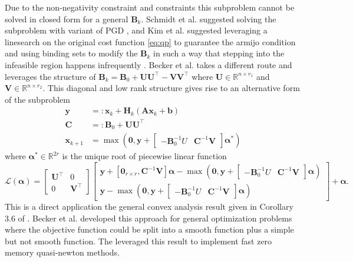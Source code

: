 \documentclass{article}
\newcommand{\x}{\mathbf{x}}
\renewcommand{\b}{\mathbf{b}}
\newcommand{\A}{\mathbf{A}}
\newcommand{\V}{\mathbf{V}}
\newcommand{\y}{\mathbf{y}}
\renewcommand{\H}{\mathbf{H}}
\newcommand{\B}{\mathbf{B}}
\newcommand{\U}{\mathbf{U}}
\begin{document}
Due to the non-negativity constraint and constraints this subproblem cannot be solved in closed form for a general $\B_k$. Schmidt et al. suggested solving the subproblem with variant of PGD \citep{SchmidtBergFriedlanderEtAl2009ProcTwelfthIntConfArtifIntellStat}, and Kim et al. suggested leveraging a linesearch on the original cost function \eqref{eq:qp} to guarantee the armijo condition and using binding sets to modify the $\B_k$ in such a way that stepping into the infeasible region happens infrequently \citep{KimSraDhillon2010SIAMJSciComput}. Becker et al. takes a different route and leverages the structure of $\B_k = \B_0 + \U\U^\top - \V\V^\top$ where $\U \in \mathbb{R}^{n\times r_1}$ and $\V \in \mathbb{R}^{n\times r_2}$. This diagonal and low rank structure gives rise to an alternative form of the subproblem  
\begin{equation} \label{eq:prox-step}
    \begin{split}
        \y &=: \x_k + \H_k (\A\x_k + \b)\\
        \mathbf{C} &=: \B_0 + \U\U^\top\\
         \x_{k+1} &= \operatorname{max}\left(\mathbf{0},\y + \begin{bmatrix} 
            - \B_0^{-1} U & \mathbf{C}^{-1} \V 
        \end{bmatrix} \boldsymbol{\alpha}^*\right) 
\end{split}
\end{equation}
where $\boldsymbol{\alpha}^* \in \mathbb{R}^{2r}$ is the unique root of piecewise linear function
\[
\mathcal{L}\left(\boldsymbol{\alpha}\right) = \begin{bmatrix} 
        \U^{\top}&0 \\ 0&\V^{\top} 
    \end{bmatrix} \begin{bmatrix} 
       \y+[\mathbf{0}_{r\times r}, \mathbf{C}^{-1} \V] \boldsymbol{\alpha}- \operatorname{max}\left(\mathbf{0},\y + \begin{bmatrix} 
            - \B_0^{-1} U & \mathbf{C}^{-1} \V 
        \end{bmatrix} \boldsymbol{\alpha}\right) \\
       \y -  \operatorname{max}\left(\mathbf{0},\y + \begin{bmatrix} 
            - \B_0^{-1} U & \mathbf{C}^{-1} \V 
        \end{bmatrix} \boldsymbol{\alpha}\right)  
    \end{bmatrix} + \boldsymbol{\alpha}.
\]
This is a direct application the general convex analysis result given in Corollary 3.6 of \citep{BeckerFadiliOchs2018arXiv180108691}. Becker et al. developed this approach for general optimization problems where the objective function could be split into a smooth function plus a simple but not smooth function. The leveraged this result to implement fast zero memory quasi-newton methods. 
\end{document}
